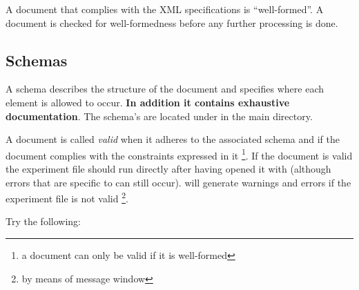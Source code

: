 

A document that complies with the XML specifications is
``well-formed''. A document is checked for well-formedness before
any further processing is done.

\subsection{Schemas}
\label{sec:Schema's}


A schema describes the structure of the document and specifies
where each element is allowed to occur. \textbf{In addition it contains exhaustive
documentation}. The \apex schema's are located under
 in the main \apex directory.

A document is called \emph {valid} when it adheres to the
associated schema and if the document complies with the
constraints expressed in it \footnote{a document can only be valid
if it is well-formed}. If the document is valid the experiment
file should run directly after having opened it with \apex
(although errors that are specific to \apex can still occur).
\apex will generate warnings and errors if the
experiment file is not valid \footnote{by means of message
window}.


Try the following:

